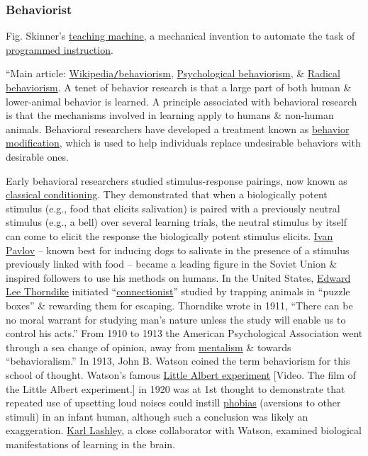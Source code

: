 \documentclass[oneside]{book}
\numberwithin{equation}{section}
\begin{document}
\subsubsection{Behaviorist}
\textsf{Fig. Skinner's \href{https://en.wikipedia.org/wiki/Teaching_machine}{teaching machine}, a mechanical invention to automate the task of \href{https://en.wikipedia.org/wiki/Programmed_instruction}{programmed instruction}.}

``Main article: \href{https://en.wikipedia.org/wiki/Behaviorism}{Wikipedia\texttt{/}behaviorism}, \href{https://en.wikipedia.org/wiki/Psychological_behaviorism}{Psychological behaviorism}, \& \href{https://en.wikipedia.org/wiki/Radical_behaviorism}{Radical behaviorism}. A tenet of behavior research is that a large part of both human \& lower-animal behavior is learned. A principle associated with behavioral research is that the mechanisms involved in learning apply to humans \& non-human animals. Behavioral researchers have developed a treatment known as \href{https://en.wikipedia.org/wiki/Behavior_modification}{behavior modification}, which is used to help individuals replace undesirable behaviors with desirable ones.

Early behavioral researchers studied stimulus-response pairings, now known as \href{https://en.wikipedia.org/wiki/Classical_conditioning}{classical conditioning}. They demonstrated that when a biologically potent stimulus (e.g., food that elicits salivation) is paired with a previously neutral stimulus (e.g., a bell) over several learning trials, the neutral stimulus by itself can come to elicit the response the biologically potent stimulus elicits. \href{https://en.wikipedia.org/wiki/Ivan_Pavlov}{Ivan Pavlov} -- known best for inducing dogs to salivate in the presence of a stimulus previously linked with food -- became a leading figure in the Soviet Union \& inspired followers to use his methods on humans. In the United States, \href{https://en.wikipedia.org/wiki/Edward_Lee_Thorndike}{Edward Lee Thorndike} initiated ``\href{https://en.wikipedia.org/wiki/Connectionism}{connectionist}'' studied by trapping animals in ``puzzle boxes'' \& rewarding them for escaping. Thorndike wrote in 1911, ``There can be no moral warrant for studying man's nature unless the study will enable us to control his acts.'' From 1910 to 1913 the American Psychological Association went through a sea change of opinion, away from \href{https://en.wikipedia.org/wiki/Mentalism_(psychology)}{mentalism} \& towards ``behavioralism.'' In 1913, John B. Watson coined the term behaviorism for this school of thought. Watson's famous \href{https://en.wikipedia.org/wiki/Little_Albert_experiment}{Little Albert experiment} [\textsf{Video. The film of the Little Albert experiment.}] in 1920 was at 1st thought to demonstrate that repeated use of upsetting loud noises could instill \href{https://en.wikipedia.org/wiki/Phobia}{phobias} (aversions to other stimuli) in an infant human, although such a conclusion was likely an exaggeration. \href{https://en.wikipedia.org/wiki/Karl_Lashley}{Karl Lashley}, a close collaborator with Watson, examined biological manifestations of learning in the brain.
\end{document}
